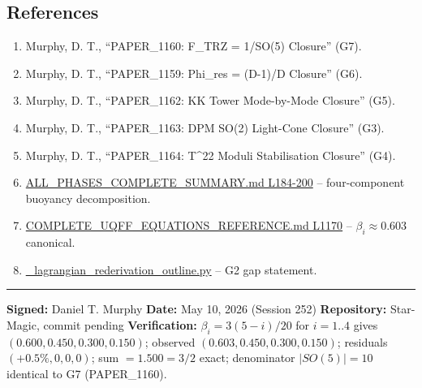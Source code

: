 \documentclass[
]{article}
\providecommand{\tightlist}{%
  \setlength{\itemsep}{0pt}\setlength{\parskip}{0pt}}
\begin{document}
\subsection{References}\label{references}

\begin{enumerate}
\def\labelenumi{\arabic{enumi}.}
\tightlist
\item
  Murphy, D. T., ``PAPER\_1160: F\_TRZ = 1/\textbar SO(5)\textbar{}
  Closure'' (G7).
\item
  Murphy, D. T., ``PAPER\_1159: Phi\_res = (D-1)/D Closure'' (G6).
\item
  Murphy, D. T., ``PAPER\_1162: KK Tower Mode-by-Mode Closure'' (G5).
\item
  Murphy, D. T., ``PAPER\_1163: DPM SO(2) Light-Cone Closure'' (G3).
\item
  Murphy, D. T., ``PAPER\_1164: T\^{}22 Moduli Stabilisation Closure''
  (G4).
\item
  \href{ALL_PHASES_COMPLETE_SUMMARY.md\#L184}{ALL\_PHASES\_COMPLETE\_SUMMARY.md
  L184-200} -- four-component buoyancy decomposition.
\item
  \href{COMPLETE_UQFF_EQUATIONS_REFERENCE.md\#L1170}{COMPLETE\_UQFF\_EQUATIONS\_REFERENCE.md
  L1170} -- \(\beta_i \approx 0.603\) canonical.
\item
  \url{_lagrangian_rederivation_outline.py} -- G2 gap statement.
\end{enumerate}

\begin{center}\rule{0.5\linewidth}{0.5pt}\end{center}

\textbf{Signed:} Daniel T. Murphy \textbf{Date:} May 10, 2026 (Session
252) \textbf{Repository:} Star-Magic, commit pending
\textbf{Verification:} \(\beta_i = 3(5-i)/20\) for \(i=1..4\) gives
\((0.600, 0.450, 0.300, 0.150)\); observed
\((0.603, 0.450, 0.300, 0.150)\); residuals \((+0.5\%, 0, 0, 0)\); sum
\(= 1.500 = 3/2\) exact; denominator \(|SO(5)| = 10\) identical to G7
(PAPER\_1160).




\end{document}
